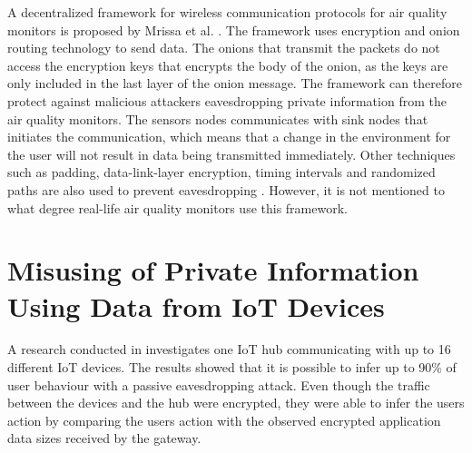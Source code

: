 A decentralized framework for wireless communication protocols for air quality monitors is proposed by Mrissa et al. \cite{PrivacyAndFrameworkDecentAQM}. The framework uses encryption and onion routing technology to send data. The onions that transmit the packets do not access the encryption keys that encrypts the body of the onion, as the keys are only included in the last layer of the onion message. The framework can therefore protect against malicious attackers eavesdropping private information from the air quality monitors. The sensors nodes communicates with sink nodes that initiates the communication, which means that a change in the environment for the user will not result in data being transmitted immediately. Other techniques such as padding, data-link-layer encryption, timing intervals and randomized paths are also used to prevent eavesdropping \cite{PrivacyAndFrameworkDecentAQM}. However, it is not mentioned to what degree real-life air quality monitors use this framework. 

\section{Misusing of Private Information Using Data from IoT Devices}
A research conducted in \cite{PassiveInferenceIoT} investigates one \gls{IoT} hub communicating with up to 16 different \gls{IoT} devices. The results showed that it is possible to infer up to 90\% of user behaviour with a passive eavesdropping attack. Even though the traffic between the devices and the hub were encrypted, they were able to infer the users action by comparing the users action with the observed encrypted application data sizes received by the gateway. 

